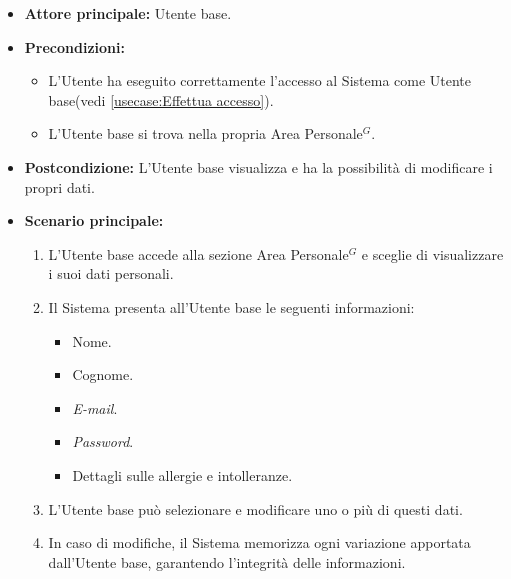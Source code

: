 \label{usecase:Visualizzazione e modifica dati utente}
\begin{itemize}
	\item \textbf{Attore principale:} Utente base.

	\item \textbf{Precondizioni:}
	\begin{itemize}
        \item L'Utente ha eseguito correttamente l'accesso al Sistema come Utente base(vedi \autoref{usecase:Effettua accesso}).
        \item L'Utente base si trova nella propria Area Personale$^G$.
    \end{itemize}

	\item \textbf{Postcondizione:} L'Utente base visualizza e ha la possibilità di modificare i propri dati.

	\item \textbf{Scenario principale:}
	      \begin{enumerate}
		      \item L'Utente base accede alla sezione Area Personale$^G$ e sceglie di visualizzare i suoi dati personali.
		      \item Il Sistema presenta all'Utente base le seguenti informazioni:
              \begin{itemize}
                \item Nome.
                \item Cognome.
                \item \textit{E-mail}.
                \item \textit{Password}.
                \item Dettagli sulle allergie e intolleranze.
              \end{itemize}
              \item L'Utente base può  selezionare e modificare uno o più di questi dati.
              \item In caso di modifiche, il Sistema memorizza ogni variazione apportata dall'Utente base, garantendo l'integrità delle informazioni.
	      \end{enumerate}
\end{itemize}
